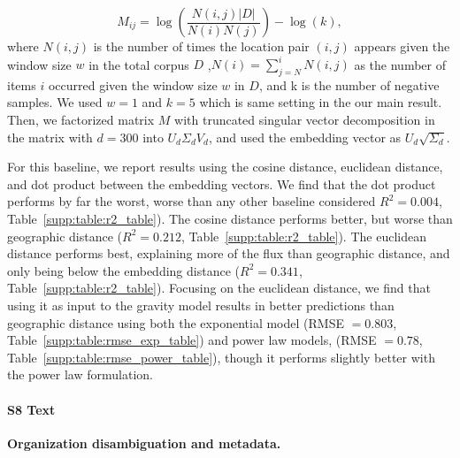 \documentclass[12pt]{article} %
\begin{document}
\begin{equation}
 M_{ij} = \log(\frac{N(i,j) |D|}{N(i) N(j)}) - \log(k),
\end{equation}
where $N(i,j)$ is the number of times the location pair $(i,j)$ appears given the window size $w$ in the total corpus $D$ ,$N(i)=\sum_{j=N}^i N(i,j)$ as the number of items $i$ occurred given the window size $w$ in $D$, and k is the number of negative samples. We used $w=1$ and $k=5$ which is same setting in the our main result. Then, we factorized matrix $M$ with truncated singular vector decomposition in the matrix with $d=300$ into $U_d \Sigma_d V_d$, and used the embedding vector as $U_d\sqrt{\Sigma_d}$.

For this baseline, we report results using the cosine distance, euclidean distance, and dot product between the embedding vectors. 
We find that the dot product performs by far the worst, worse than any other baseline considered $R^{2} = 0.004$, Table~\ref{supp:table:r2_table}). 
The cosine distance performs better, but worse than geographic distance ($R^{2} = 0.212$, Table~\ref{supp:table:r2_table}). 
The euclidean distance performs best, explaining more of the flux than geographic distance, and only being below the embedding distance ($R^{2} = 0.341$, Table~\ref{supp:table:r2_table}). 
Focusing on the euclidean distance, we find that using it as input to the gravity model results in better predictions than geographic distance using both the exponential model (RMSE $= 0.803$, Table~\ref{supp:table:rmse_exp_table}) and power law models, (RMSE $= 0.78$, Table~\ref{supp:table:rmse_power_table}), though it performs slightly better with the power law formulation.

%
\paragraph*{S8 Text}
\label{si:text:organizations}
{\bf Organization disambiguation and metadata.}
\end{document}

